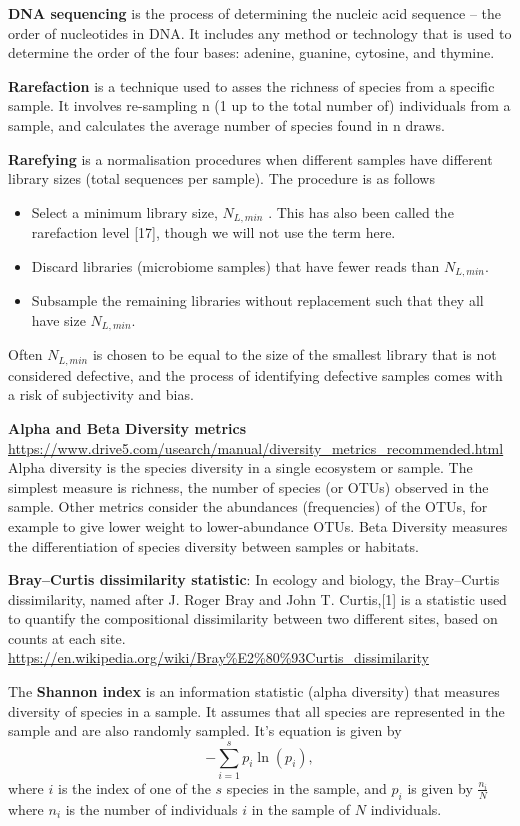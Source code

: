 \textbf{DNA sequencing }is the process of determining the nucleic acid sequence – the order of nucleotides in DNA. It includes any method or technology that is used to determine the order of the four bases: adenine, guanine, cytosine, and thymine.

\textbf{Rarefaction} is a technique used to asses the richness of species from a specific sample. It involves re-sampling n (1 up to the total number of) individuals from a sample, and calculates the average number of species found in n draws. 

\textbf{Rarefying} is a normalisation procedures when different samples have different library sizes (total sequences per sample). The procedure is as follows

\begin{itemize}
    \item Select a minimum library size, $N_{L,min}$ . This has also been called the rarefaction level [17], though we will not use the term here.
    \item Discard libraries (microbiome samples) that have fewer reads than  $N_{L,min}$.
    \item Subsample the remaining libraries without replacement such that they all have size  $N_{L,min}$.
\end{itemize}

Often  $N_{L,min}$ is chosen to be equal to the size of the smallest library that is not considered defective, and the process of identifying defective samples comes with a risk of subjectivity and bias. \cite{inadmissible_rareying}

\textbf{Alpha and Beta Diversity metrics}
\url{https://www.drive5.com/usearch/manual/diversity_metrics_recommended.html}
Alpha diversity is the species diversity in a single ecosystem or sample. The simplest measure is richness, the number of species (or OTUs) observed in the sample. Other metrics consider the abundances (frequencies) of the OTUs, for example to give lower weight to lower-abundance OTUs.  
Beta Diversity measures the differentiation of species diversity between samples or habitats. 

\textbf{Bray–Curtis dissimilarity statistic}:
In ecology and biology, the Bray–Curtis dissimilarity, named after J. Roger Bray and John T. Curtis,[1] is a statistic used to quantify the compositional dissimilarity between two different sites, based on counts at each site. \url{https://en.wikipedia.org/wiki/Bray%E2%80%93Curtis_dissimilarity}

The \textbf{Shannon index} is an information statistic (alpha diversity) that measures diversity of species in a sample. It assumes that all species are represented in the sample and are also randomly sampled. It's equation is given by
$$-\sum_{i=1}^s p_i \ln(p_i),$$
where $i$ is the index of one of the $s$ species in the sample, and $p_i$ is given by $\frac{n_i}{N}$ where $n_i$ is the number of individuals $i$ in the sample of $N$ individuals.

